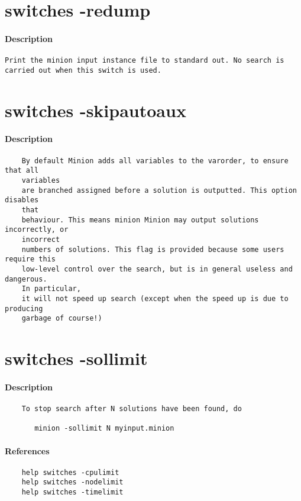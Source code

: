 \section{switches -redump}
\paragraph{Description}
{\footnotesize
\begin{verbatim}
Print the minion input instance file to standard out. No search is
carried out when this switch is used.
\end{verbatim}
}
\section{switches -skipautoaux}
\paragraph{Description}
{\footnotesize
\begin{verbatim}
    By default Minion adds all variables to the varorder, to ensure that all
    variables
    are branched assigned before a solution is outputted. This option disables
    that
    behaviour. This means minion Minion may output solutions incorrectly, or
    incorrect
    numbers of solutions. This flag is provided because some users require this
    low-level control over the search, but is in general useless and dangerous.
    In particular,
    it will not speed up search (except when the speed up is due to producing
    garbage of course!)
\end{verbatim}
}
\section{switches -sollimit}
\paragraph{Description}
{\footnotesize
\begin{verbatim}
    To stop search after N solutions have been found, do

       minion -sollimit N myinput.minion
\end{verbatim}
}
\paragraph{References}
{\footnotesize
\begin{verbatim}
    help switches -cpulimit
    help switches -nodelimit
    help switches -timelimit
\end{verbatim}
}
